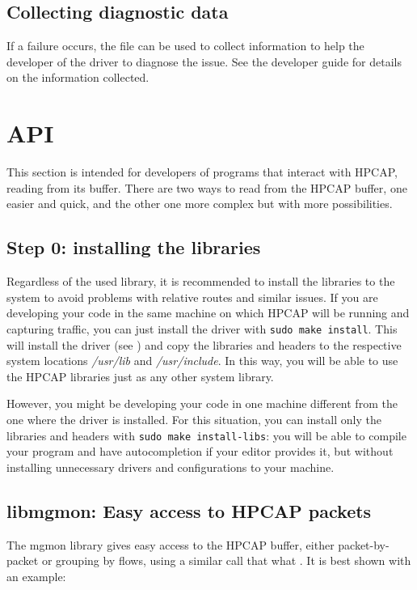 \documentclass[a4paper,oneside]{hpman}
\begin{document}
\section{Collecting diagnostic data}
\label{sec:DiagnosticData}

If a failure occurs, the file  can be used to collect information to help the developer of the driver to diagnose the issue. See the developer guide for details on the information collected.

\chapter{API}

This section is intended for developers of programs that interact with HPCAP, reading from its buffer. There are two ways to read from the HPCAP buffer, one easier and quick, and the other one more complex but with more possibilities.

\section{Step 0: installing the libraries}

Regardless of the used library, it is recommended to install the libraries to the system to avoid problems with relative routes and similar issues. If you are developing your code in the same machine on which HPCAP will be running and capturing traffic, you can just install the driver with \texttt{sudo make install}. This will install the driver (see ) and copy the libraries and headers to the respective system locations \textit{/usr/lib} and \textit{/usr/include}. In this way, you will be able to use the HPCAP libraries just as any other system library.

However, you might be developing your code in one machine different from the one where the driver is installed. For this situation, you can install only the libraries and headers with \texttt{sudo make install-libs}: you will be able to compile your program and have autocompletion if your editor provides it, but without installing unnecessary drivers and configurations to your machine.

\section{libmgmon: Easy access to HPCAP packets}

The mgmon library gives easy access to the HPCAP buffer, either packet-by-packet or grouping by flows, using a similar call that what . It is best shown with an example:
\end{document}
